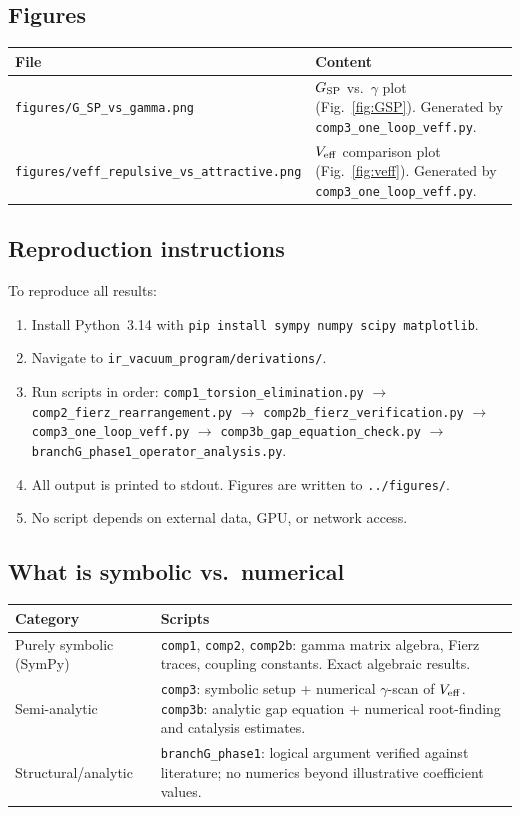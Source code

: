 \documentclass[11pt,letterpaper]{article}
\newcommand{\BI}{\gamma}               %
\newcommand{\Gsp}{G_{\rm SP}}
\newcommand{\Veff}{V_{\rm eff}}
\begin{document}
\subsection{Figures}

\begin{longtable}{@{}p{}p{}@{}}
\toprule
File & Content \\
\midrule
\texttt{figures/G\_SP\_vs\_gamma.png} &
  $\Gsp$ vs.\ $\BI$ plot (Fig.~\ref{fig:GSP}).
  Generated by \texttt{comp3\_one\_loop\_veff.py}. \\
\texttt{figures/veff\_repulsive\_vs\_attractive.png} &
  $\Veff$ comparison plot (Fig.~\ref{fig:veff}).
  Generated by \texttt{comp3\_one\_loop\_veff.py}. \\
\bottomrule
\end{longtable}

\subsection{Reproduction instructions}

To reproduce all results:
\begin{enumerate}
  \item Install Python~3.14 with \texttt{pip install sympy numpy scipy
    matplotlib}.
  \item Navigate to \texttt{ir\_vacuum\_program/derivations/}.
  \item Run scripts in order:
    \texttt{comp1\_torsion\_elimination.py} $\to$
    \texttt{comp2\_fierz\_rearrangement.py} $\to$
    \texttt{comp2b\_fierz\_verification.py} $\to$
    \texttt{comp3\_one\_loop\_veff.py} $\to$
    \texttt{comp3b\_gap\_equation\_check.py} $\to$
    \texttt{branchG\_phase1\_operator\_analysis.py}.
  \item All output is printed to stdout. Figures are written to
    \texttt{../figures/}.
  \item No script depends on external data, GPU, or network access.
\end{enumerate}

\subsection{What is symbolic vs.\ numerical}

\begin{longtable}{@{}p{}p{}@{}}
\toprule
Category & Scripts \\
\midrule
Purely symbolic (SymPy) &
  \texttt{comp1}, \texttt{comp2}, \texttt{comp2b}: gamma matrix algebra,
  Fierz traces, coupling constants. Exact algebraic results. \\
Semi-analytic &
  \texttt{comp3}: symbolic setup + numerical $\BI$-scan of $\Veff$.
  \texttt{comp3b}: analytic gap equation + numerical root-finding
  and catalysis estimates. \\
Structural/analytic &
  \texttt{branchG\_phase1}: logical argument verified against literature;
  no numerics beyond illustrative coefficient values. \\
\bottomrule
\end{longtable}
\end{document}
